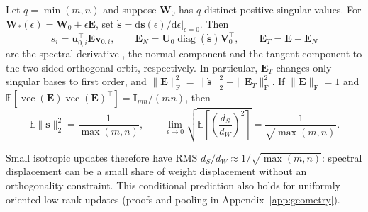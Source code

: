 \begin{proposition}\label{prop:first-order-motion}
Let $q=\min(m,n)$ and suppose $\bm W_0$ has $q$ distinct positive singular values. For $\bm W_*(\epsilon)=\bm W_0+\epsilon\bm E$, set $\dot{\bm s}=\left.\mathrm d\bm s(\epsilon)/\mathrm d\epsilon\right|_{\epsilon=0}$. Then
\begin{equation}\label{eq:tangent-normal}
\dot s_i=\bm u_{0,i}^{\!\top}\bm E\bm v_{0,i},\qquad
\bm E_N=\bm U_0\operatorname{diag}(\dot{\bm s})\bm V_0^{\!\top},\qquad
\bm E_T=\bm E-\bm E_N
\end{equation}
are the spectral derivative \citep{stewart1990}, the normal component and the tangent component to the two-sided orthogonal orbit, respectively. In particular, $\bm E_T$ changes only singular bases to first order, and $\|\bm E\|_{\mathrm F}^2=\|\dot{\bm s}\|_2^2+\|\bm E_T\|_{\mathrm F}^2$. If $\|\bm E\|_{\mathrm F}=1$ and $\mathbb E[\operatorname{vec}(\bm E)\operatorname{vec}(\bm E)^{\!\top}]=\bm I_{mn}/(mn)$, then
\begin{equation}\label{eq:relative-spectral-scale}
\mathbb E\|\dot{\bm s}\|_2^2=\frac{1}{\max(m,n)},\qquad
\lim_{\epsilon\to0}\sqrt{\mathbb E\left[\left(\frac{d_S}{d_W}\right)^2\right]}=\frac{1}{\sqrt{\max(m,n)}}.
\end{equation}
\end{proposition}
Small isotropic updates therefore have RMS $d_S/d_W\approx1/\sqrt{\max(m,n)}$: spectral displacement can be a small share of weight displacement without an orthogonality constraint. This conditional prediction also holds for uniformly oriented low-rank updates (proofs and pooling in Appendix~\ref{app:geometry}).


